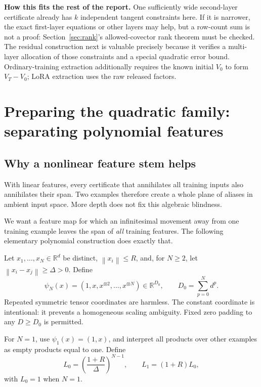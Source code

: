 \documentclass[12pt,a4paper]{article}
\theoremstyle{readable}
\theoremstyle{definition}\newtheorem{example}[theorem]{Example}
\newcommand{\R}{\mathbb R}\newcommand{\rank}{\operatorname{rank}}
\newcommand{\norm}[1]{\left\|#1\right\|}
\begin{document}
\textbf{How this fits the rest of the report.} One sufficiently wide second-layer certificate already has \(k\) independent tangent constraints here. If it is narrower, the exact first-layer equations or other layers may help, but a row-count sum is not a proof: Section~\ref{sec:rank}'s allowed-covector rank theorem must be checked. The residual construction next is valuable precisely because it verifies a multi-layer allocation of those constraints and a special quadratic error bound. Ordinary-training extraction additionally requires the known initial \(V_0\) to form \(V_T-V_0\); LoRA extraction uses the raw released factors.

\section{Preparing the quadratic family: separating polynomial features}
\label{sec:poly}

\subsection{Why a nonlinear feature stem helps}
With linear features, every certificate that annihilates all training inputs also annihilates their span. Two examples therefore create a whole plane of aliases in ambient input space. More depth does not fix this algebraic blindness.

We want a feature map for which an infinitesimal movement away from one training example leaves the span of \emph{all} training features. The following elementary polynomial construction does exactly that.

Let \(x_1,\ldots,x_N\in\R^d\) be distinct, \(\norm{x_i}\le R\), and, for \(N\ge2\), let \(\norm{x_i-x_j}\ge\Delta>0\). Define
\[
\psi_N(x)=(1,x,x^{\otimes2},\ldots,x^{\otimes N})\in\R^{D_0},
\qquad D_0=\sum_{p=0}^N d^p.
\]
Repeated symmetric tensor coordinates are harmless. The constant coordinate is intentional: it prevents a homogeneous scaling ambiguity. Fixed zero padding to any \(D\ge D_0\) is permitted.

For \(N=1\), use \(\psi_1(x)=(1,x)\), and interpret all products over other examples as empty products equal to one. Define
\[
L_0=\left(\frac{1+R}{\Delta}\right)^{N-1},\qquad
L_1=(1+R)L_0,
\]
with \(L_0=1\) when \(N=1\).
\end{document}
